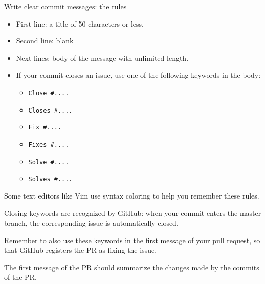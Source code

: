 \documentclass[8pt]{beamer}
\begin{document}
\begin{frame}{Write clear commit messages: the rules}
    \begin{itemize}
        \item First line: a \alert{title} of 50 characters or less.
        \item Second line: \alert{blank}
        \item Next lines: \alert{body} of the message with unlimited length.
        \item If your commit \alert{closes an issue}, use one of the following keywords in the body:
        \begin{itemize}
            \item \texttt{Close \#....}
            \item \texttt{Closes \#....}
            \item \texttt{Fix \#....}
            \item \texttt{Fixes \#....}
            \item \texttt{Solve \#....}
            \item \texttt{Solves \#....}
        \end{itemize}
    \end{itemize}

    Some text editors like Vim use syntax coloring to help you remember these rules.

    Closing keywords are recognized by GitHub: when your commit enters the master branch,
    the corresponding issue is \alert{automatically closed}.

    Remember to also use these \alert{keywords in the first message} of your \alert{pull request},
    so that GitHub registers the PR as fixing the issue.

    The first message of the PR should \alert{summarize the changes} made by the commits of the PR.


\end{frame}
\end{document}
